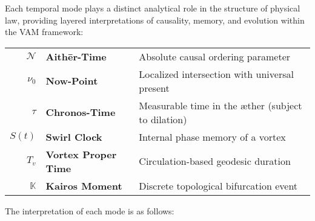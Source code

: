 \documentclass[preprint]{revtex4-2}
\begin{document}
Each temporal mode plays a distinct analytical role in the structure of physical law, providing layered interpretations of causality, memory, and evolution within the VAM framework:

\begin{center}
\begin{tcolorbox}[
  colback=gray!10,
  colframe=black,
  width=0.9\textwidth,
  sharp corners=southwest,
  boxrule=0.5pt,
  before skip=10pt,
  after skip=10pt,
  title=\textbf{Table: Ætheric Time Modes in the Vortex Æther Model},
  fonttitle=\bfseries,
]
\renewcommand{\arraystretch}{1.25}
    \small
        \begin{tabular}{r l l}
  \(\mathcal{N}\)     & \textbf{Aithēr-Time}         & Absolute causal ordering parameter \\
  \(\nu_0\)           & \textbf{Now-Point}           & Localized intersection with universal present \\
  \(\tau\)            & \textbf{Chronos-Time}        & Measurable time in the æther (subject to dilation) \\
  \(S(t)\)            & \textbf{Swirl Clock}         & Internal phase memory of a vortex \\
  \(T_v\)             & \textbf{Vortex Proper Time}  & Circulation-based geodesic duration \\
  \(\mathbb{K}\)      & \textbf{Kairos Moment}       & Discrete topological bifurcation event \\
\end{tabular}
\end{tcolorbox}
\end{center}

\noindent The interpretation of each mode is as follows:
\end{document}
